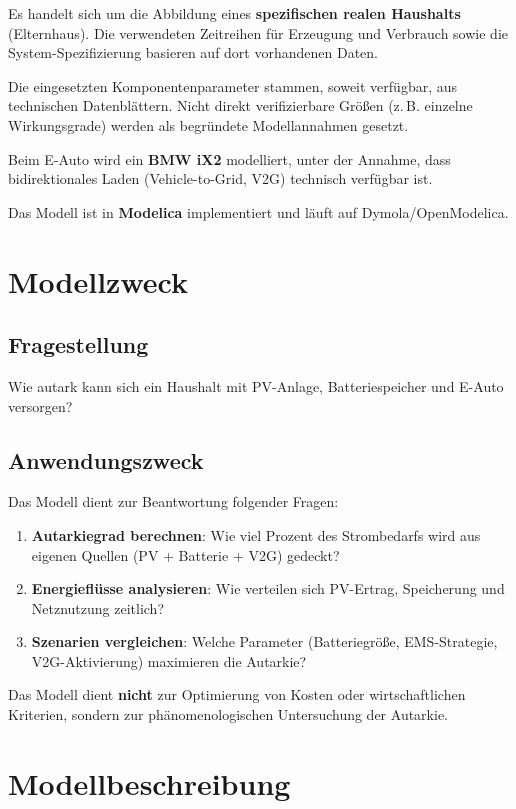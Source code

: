\documentclass[conference]{IEEEtran}
\begin{document}
Es handelt sich um die Abbildung eines \textbf{spezifischen realen Haushalts} (Elternhaus). Die verwendeten Zeitreihen für Erzeugung und Verbrauch sowie die System-Spezifizierung basieren auf dort vorhandenen Daten.

Die eingesetzten Komponentenparameter stammen, soweit verfügbar, aus technischen Datenblättern. Nicht direkt verifizierbare Größen (z.\,B. einzelne Wirkungsgrade) werden als begründete Modellannahmen gesetzt.

Beim E-Auto wird ein \textbf{BMW iX2} modelliert, unter der Annahme, dass bidirektionales Laden (Vehicle-to-Grid, V2G) technisch verfügbar ist.

Das Modell ist in \textbf{Modelica} implementiert und läuft auf Dymola/OpenModelica.

\section{Modellzweck}

\subsection{Fragestellung}

Wie autark kann sich ein Haushalt mit PV-Anlage, Batteriespeicher und E-Auto versorgen?

\subsection{Anwendungszweck}

Das Modell dient zur Beantwortung folgender Fragen:

\begin{enumerate}
\item \textbf{Autarkiegrad berechnen}: Wie viel Prozent des Strombedarfs wird aus eigenen Quellen (PV + Batterie + V2G) gedeckt?
\item \textbf{Energieflüsse analysieren}: Wie verteilen sich PV-Ertrag, Speicherung und Netznutzung zeitlich?
\item \textbf{Szenarien vergleichen}: Welche Parameter (Batteriegröße, EMS-Strategie, V2G-Aktivierung) maximieren die Autarkie?
\end{enumerate}

Das Modell dient \textbf{nicht} zur Optimierung von Kosten oder wirtschaftlichen Kriterien, sondern zur phänomenologischen Untersuchung der Autarkie.

\section{Modellbeschreibung}
\end{document}
